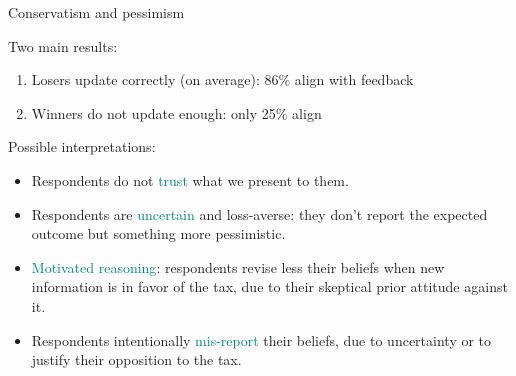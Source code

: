 \documentclass[aspectratio=169,9pt,dvipsnames]{beamer}
\begin{document}


    
    





    \begin{frame}{Conservatism and pessimism}\label{conservatism}

Two main results:

\begin{enumerate}
    \item Losers update correctly (on average): 86\% align with feedback
    
    \item Winners do not update enough: only 25\% align

\end{enumerate}

\medskip
\hyperlink{correct_update_origin}{}
\medskip
\pause

Possible interpretations:

\begin{itemize}
    \item Respondents do not \textcolor{teal}{trust} what we present to them.
    
    \item Respondents are \textcolor{teal}{uncertain} and loss-averse: they don't report the expected outcome but something more pessimistic.
    
    \item \textcolor{teal}{Motivated reasoning}: respondents revise less their beliefs when new information is in favor of the tax, due to their skeptical prior attitude against it.
    
    \item Respondents intentionally \textcolor{teal}{mis-report} their beliefs, due to uncertainty or to justify their opposition to the tax.
\end{itemize}

\medskip


    \end{frame}
\end{document}
